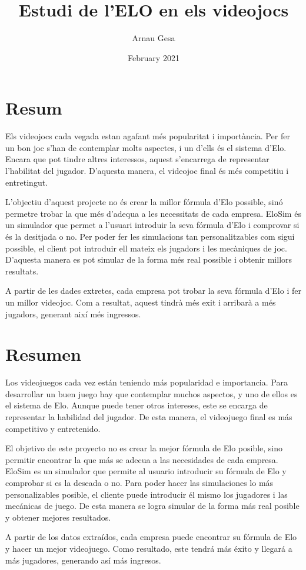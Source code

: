 \documentclass[a4paper]{article}
\title{Estudi de l'ELO en els videojocs}
\author{Arnau Gesa }
\date{February 2021}
\begin{document}


\newpage
\justify
\section*{Resum}

Els videojocs cada vegada estan agafant més popularitat i importància. Per fer un bon joc s'han de contemplar molts aspectes, i un d'ells és el sistema d'Elo. Encara que pot tindre altres interessos, aquest s'encarrega de representar l'habilitat del jugador. D'aquesta manera, el videojoc final és més competitiu i entretingut.

L'objectiu d'aquest projecte no és crear la millor fórmula d'Elo possible, sinó permetre trobar la que més d'adequa a les necessitats de cada empresa. EloSim és un simulador que permet a l'usuari introduir la seva fórmula d'Elo i comprovar si és la desitjada o no. Per poder fer les simulacions tan personalitzables com sigui possible, el client pot introduir ell mateix els jugadors i les mecàniques de joc. D'aquesta manera es pot simular de la forma més real possible i obtenir millors resultats.

A partir de les dades extretes, cada empresa pot trobar la seva fórmula d'Elo i fer un millor videojoc. Com a resultat, aquest tindrà més exit i arribarà a més jugadors, generant així més ingressos. 

\section*{Resumen}

Los videojuegos cada vez están teniendo más popularidad e importancia. Para desarrollar un buen juego hay que contemplar muchos aspectos, y uno de ellos es el sistema de Elo. Aunque puede tener otros intereses, este se encarga de representar la habilidad del jugador. De esta manera, el videojuego final es más competitivo y entretenido.

El objetivo de este proyecto no es crear la mejor fórmula de Elo posible, sino permitir encontrar la que más se adecua a las necesidades de cada empresa. EloSim es un simulador que permite al usuario introducir su fórmula de Elo y comprobar si es la deseada o no. Para poder hacer las simulaciones lo más personalizables posible, el cliente puede introducir él mismo los jugadores i las mecánicas de juego. De esta manera se logra simular de la forma más real posible y obtener mejores resultados.

A partir de los datos extraídos, cada empresa puede encontrar su fórmula de Elo y hacer un mejor videojuego. Como resultado, este tendrá más éxito y llegará a más jugadores, generando así más ingresos.
\end{document}
